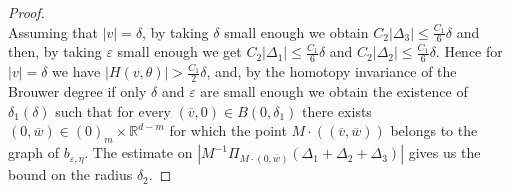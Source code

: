 \documentclass[11pt, leqno]{amsart}
\theoremstyle{definition}
\def\R{\mathbb{R}}
\begin{document}
\begin{proof}
$$	 	$$
	 	Assuming that $|v| = \delta$, by taking $\delta$ small enough we  obtain $C_2|\Delta_3| \leq \frac{C_1}{6}\delta$ and then, by taking  $\varepsilon$ small enough we get 
	 	$C_2|\Delta_1| \leq \frac{C_1}{6}\delta$ and $C_2|\Delta_2| \leq \frac{C_1}{6}\delta$. Hence for $|v| = \delta$ we have  $|H(v,\theta)| >  \frac{C_1}{2}\delta$, and, by the homotopy invariance of the Brouwer degree if only $\delta$ and $\varepsilon$ are small enough  we obtain the existence of ${\delta}_1(\delta)$ such that for every  $(\overline{v},0) \in B(0,{\delta}_1)$ there exists $(0,\overline{w})\in (0)_m\times 
	 	\R^{d-m}$ for which the point $M\cdot((\overline{v},\overline{w}))$ belongs to the graph of $b_{\varepsilon,\eta}$. The estimate on $|M^{-1}\Pi_{M\cdot(0,\overline{w})}(\Delta_1+\Delta_2+\Delta_3)|$ gives us the bound on the radius $\delta_2$. 
	 	

\end{proof}
\end{document}
